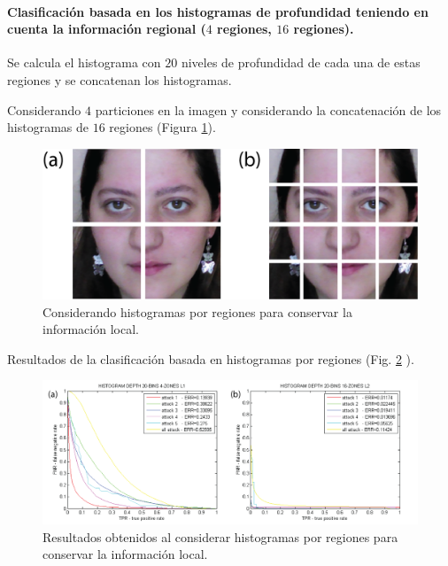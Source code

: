 \paragraph{\textbf{Clasificación basada en los histogramas de profundidad teniendo en cuenta la información regional ($4$ regiones, $16$ regiones).}}

Se calcula el histograma con $20$ niveles de profundidad de cada una de estas regiones y se concatenan los histogramas.

Considerando $4$ particiones en la imagen y considerando la concatenación de los histogramas de $16$ regiones (Figura \ref{fig:HISTOGRAMAS_POR_REGIONES}).

\begin{figure}
\centering
\includegraphics[width=1\textwidth]{ch-sistemasABC/images/ch-evaluacion_topologias/HISTOGRAMAS_ANALIZADOS_POR_REGIONES.png}
    \caption{Considerando histogramas por regiones para conservar la información local.}
    \label{fig:HISTOGRAMAS_POR_REGIONES}
\end{figure}

Resultados de la clasificación basada en histogramas por regiones (Fig. \ref{fig:RESULTADOS_HISTOGRAMAS_POR_REGIONES} ).

\begin{figure}
\centering
\includegraphics[width=1\textwidth]{ch-sistemasABC/images/ch-evaluacion_topologias/RESULTADOS_HISTOGRAMAS_POR_REGIONES.png}
    \caption{Resultados obtenidos al considerar histogramas por regiones para conservar la información local.}
    \label{fig:RESULTADOS_HISTOGRAMAS_POR_REGIONES}
\end{figure}

